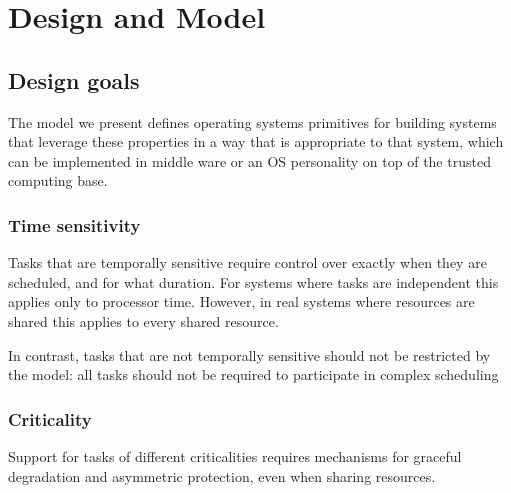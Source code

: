 \chapter{Design and Model}
\label{chap:model}

%




\section{Design goals}



The model we present defines operating systems primitives for building systems that leverage these
properties in a way that is appropriate to that system, which can be implemented in middle ware or
an OS personality on top of the trusted computing base.

\subsection{Time sensitivity}

Tasks that are temporally sensitive require control over exactly when they are scheduled, and for
what duration. For systems where tasks are independent this applies only to processor time. However,
in real systems where resources are shared this applies to every shared resource.

In contrast, tasks that are not temporally sensitive should not be restricted by the model: all
tasks should not be required to participate in complex scheduling 


\subsection{Criticality}

Support for tasks of different criticalities requires mechanisms for graceful degradation and
asymmetric protection, even when sharing resources.

